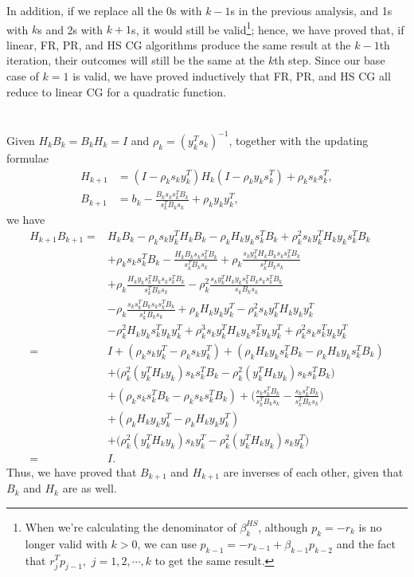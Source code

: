 \documentclass[11pt]{article}
\begin{document}
In addition, if we replace all the 0s with $k-1$s in the previous analysis, and 1s with $k$s and 2s with $k+1$s, it would still be valid\footnote{When we're calculating the denominator of $\beta^{HS}_k$, although $p_k=-r_k$ is no longer valid with $k>0$, we can use $p_{k-1} = -r_{k-1} + \beta_{k-1}p_{k-2}$ and the fact that $r_{j}^Tp_{j-1},\,\,j = 1, 2, \cdots, k$ to get the same result.}; hence, we have proved that, if linear, FR, PR, and HS CG algorithms produce the same result at the ${k-1}$th iteration, their outcomes will still be the same at the $k$th step. Since our base case of $k=1$ is valid, we have proved inductively that FR, PR, and HS CG all reduce to linear CG for a quadratic function. 

\section{}
Given $H_kB_k = B_kH_k=I$ and $\rho_k = (y_k^Ts_k)^{-1}$, together with the updating formulae
\begin{equation}\begin{split} 
H_{k+1} &= (I-\rho_k s_k y_k^T )H_k(I-\rho_ky_ks_k^T) + \rho_ks_ks_k^T,\\
B_{k+1} &=b_k - \frac{B_ks_ks_k^TB_k}{s_k^TB_ks_k} + \rho_ky_ky_k^T,
\end{split}\nonumber\end{equation} 
we have 
\begin{equation}\begin{split} 
H_{k+1}B_{k+1} =& H_kB_k -\rho_ks_ky_k^TH_kB_k - \rho_kH_ky_ks_k^TB_k + \rho_k^2s_ky_k^TH_ky_ks_k^TB_k \\
& +\rho_ks_ks_k^TB_k-\frac{H_kB_ks_ks_k^TB_k}{s_k^TB_ks_k} + \rho_k\frac{s_ky_k^TH_kB_ks_ks_k^TB_k}{s_k^TB_ks_k}\\
&+\rho_k\frac{H_ky_ks_k^TB_ks_ks_k^TB_k}{s_k^TB_ks_k} -\rho_k^2\frac{s_ky_k^TH_ky_ks_k^TB_ks_ks_k^TB_k}{s_kB_ks_k}\\
&-\rho_k\frac{s_ks_k^TB_ks_ks_k^TB_k}{s_k^TB_ks_k}+\rho_kH_ky_ky_k^T-\rho_k^2s_ky_k^TH_ky_ky_k^T \\
&- \rho_k^2H_ky_ks_k^Ty_ky_k^T + \rho_k^3s_ky_k^TH_ky_ks_k^Ty_ky_k^T + \rho_k^2s_ks_k^Ty_ky_k^T \\
=&I + (\rho_ks_ky_k^T - \rho_ks_ky_k^T) + (\rho_kH_ky_ks_k^TB_k-\rho_kH_ky_ks_k^TB_k) \\
& + \Big(\rho_k^2(y_k^TH_ky_k)s_ks_k^TB_k - \rho_k^2(y_k^TH_ky_k)s_ks_k^TB_k \Big) \\
& +(\rho_ks_ks_k^TB_k - \rho_ks_ks_k^TB_k) + \Big(\frac{s_ks_k^TB_k}{s_k^TB_ks_k}-\frac{s_ks_k^TB_k}{s_k^TB_ks_k} \Big) \\
& + (\rho_kH_ky_ky_k^T - \rho_kH_ky_ky_k^T) \\
& + \Big( \rho_k^2(y_k^TH_ky_k)s_ky_k^T - \rho_k^2(y_k^TH_ky_k)s_ky_k^T \Big) \\
=&I.
\end{split}\nonumber\end{equation} 
Thus, we have proved that $B_{k+1}$ and $H_{k+1}$ are inverses of each other, given that $B_k$ and $H_k$ are as well.
\end{document}
